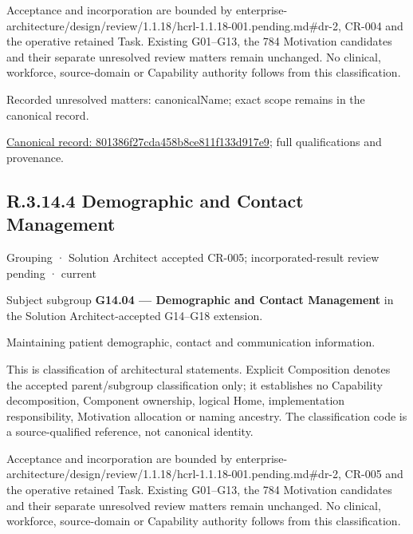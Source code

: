 Acceptance and incorporation are bounded by enterprise-architecture/design/review/1.1.18/hcrl-1.1.18-001.pending.md\#dr-2, CR-004 and the operative retained Task. Existing G01–G13, the 784 Motivation candidates and their separate unresolved review matters remain unchanged. No clinical, workforce, source-domain or Capability authority follows from this classification.


{\small Recorded unresolved matters: canonicalName; exact scope remains in the canonical record.}\par
{\footnotesize \href{../../../../continuum/grouping/801386f27cda458b8ce811f133d917e9.md}{Canonical record: 801386f27cda458b8ce811f133d917e9}; full qualifications and provenance.}\par
\subsection*{R.3.14.4 Demographic and Contact Management}
\label{navigation:R.3.14.4}

\label{element:58c5443983854dd98cd72f2dd795c063}
{\small Grouping · Solution Architect accepted CR-005; incorporated-result review pending · current}\par

Subject subgroup \textbf{G14.04 — Demographic and Contact Management} in the Solution Architect-accepted G14–G18 extension.



Maintaining patient demographic, contact and communication information.



This is classification of architectural statements. Explicit Composition denotes the accepted parent/subgroup classification only; it establishes no Capability decomposition, Component ownership, logical Home, implementation responsibility, Motivation allocation or naming ancestry. The classification code is a source-qualified reference, not canonical identity.



Acceptance and incorporation are bounded by enterprise-architecture/design/review/1.1.18/hcrl-1.1.18-001.pending.md\#dr-2, CR-005 and the operative retained Task. Existing G01–G13, the 784 Motivation candidates and their separate unresolved review matters remain unchanged. No clinical, workforce, source-domain or Capability authority follows from this classification.


